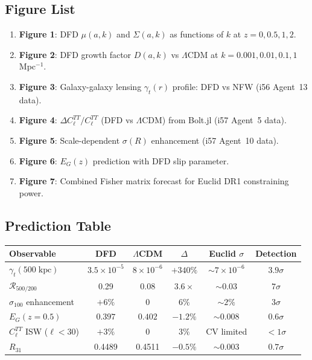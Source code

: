 \documentclass[11pt,a4paper]{article}
\begin{document}
\subsection{Figure List}

\begin{enumerate}
\item \textbf{Figure 1}: DFD $\mu(a,k)$ and $\Sigma(a,k)$ as functions of $k$ at $z = 0, 0.5, 1, 2$.
\item \textbf{Figure 2}: DFD growth factor $D(a,k)$ vs $\Lambda$CDM at $k = 0.001, 0.01, 0.1, 1$ Mpc$^{-1}$.
\item \textbf{Figure 3}: Galaxy-galaxy lensing $\gamma_t(r)$ profile: DFD vs NFW (i56 Agent~13 data).
\item \textbf{Figure 4}: $\Delta C_\ell^{TT} / C_\ell^{TT}$ (DFD vs $\Lambda$CDM) from Bolt.jl (i57 Agent~5 data).
\item \textbf{Figure 5}: Scale-dependent $\sigma(R)$ enhancement (i57 Agent~10 data).
\item \textbf{Figure 6}: $E_G(z)$ prediction with DFD slip parameter.
\item \textbf{Figure 7}: Combined Fisher matrix forecast for Euclid DR1 constraining power.
\end{enumerate}

\subsection{Prediction Table}

\begin{center}
\begin{longtable}{p{4cm}ccccc}
\toprule
\textbf{Observable} & \textbf{DFD} & \textbf{$\Lambda$CDM} & \textbf{$\Delta$} & \textbf{Euclid $\sigma$} & \textbf{Detection} \\
\midrule
$\gamma_t(500\;\mathrm{kpc})$ & $3.5 \times 10^{-5}$ & $8 \times 10^{-6}$ & $+340\%$ & $\sim 7 \times 10^{-6}$ & $3.9\sigma$ \\
$\mathcal{R}_{500/200}$ & 0.29 & 0.08 & $3.6\times$ & $\sim 0.03$ & $7\sigma$ \\
$\sigma_{100}$ enhancement & $+6\%$ & $0$ & $6\%$ & $\sim 2\%$ & $3\sigma$ \\
$E_G(z=0.5)$ & $0.397$ & $0.402$ & $-1.2\%$ & $\sim 0.008$ & $0.6\sigma$ \\
$C_\ell^{TT}$ ISW ($\ell < 30$) & $+3\%$ & $0$ & $3\%$ & CV limited & $< 1\sigma$ \\
$R_{31}$ & 0.4489 & 0.4511 & $-0.5\%$ & $\sim 0.003$ & $0.7\sigma$ \\
\bottomrule
\end{longtable}
\end{center}
\end{document}
